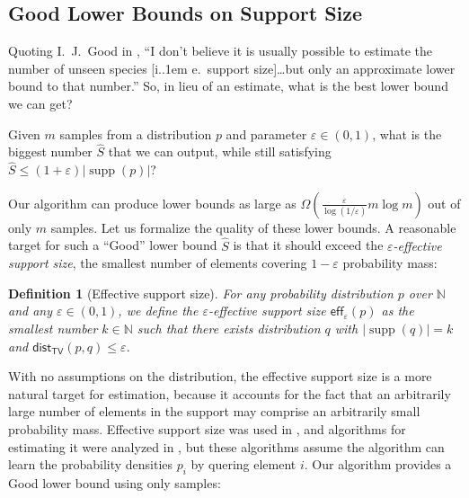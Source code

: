 \documentclass[10pt,a4paper]{article}
\newtheorem{definition}{Definition}[section]
\newcommand*\ie{i.\kern.1em e.\ }
\DeclareMathOperator{\supp}{supp}   %
\newcommand{\dist}{\mathsf{dist}}
\newcommand{\bN}{\ensuremath{\mathbb{N}}}
\newcommand{\TV}{\mathsf{TV}}
\newcommand{\eff}{\mathsf{eff}}
\renewcommand{\epsilon}{\varepsilon}
\begin{document}
\subsection{Good Lower Bounds on Support Size}
Quoting I.~J.~Good in \cite{BF93}, ``I don't believe it is usually possible to estimate the number
of unseen species [\ie support size]\dots but only an approximate lower bound to that number.'' So,
in lieu of an estimate, what is the best lower bound we can get?
\begin{question}
\label{question:good-lb}
Given $m$ samples from a distribution $p$ and parameter $\epsilon \in (0,1)$, what is the biggest
number $\widehat S$ that we can output, while still satisfying $\widehat S \leq
(1+\epsilon)|\supp(p)|$?
\end{question}
Our algorithm can produce lower bounds as large as $\Omega(\tfrac{\epsilon}{\log(1/\epsilon)} m \log
m)$ out of only $m$ samples. Let us formalize the quality of these lower bounds.  A reasonable
target for such a ``Good'' lower bound $\widehat S$ is that it should exceed the
\emph{$\epsilon$-effective support size}, the smallest number of elements covering $1-\epsilon$
probability mass:

\begin{definition}[Effective support size]
\label{def:effective}
For any probability distribution $p$ over $\bN$ and any $\epsilon \in (0,1)$, we define the
\emph{$\epsilon$-effective support size} $\eff_\epsilon(p)$ as the smallest number $k \in \bN$
such that there exists distribution $q$ with $|\supp(q)|=k$ and $\dist_\TV(p,q) \leq \epsilon$.
\end{definition}

\noindent
With no assumptions on the distribution, the effective support size is a more natural target for
estimation, because it accounts for the fact that an arbitrarily large number of elements in the
support may comprise an arbitrarily small probability mass. Effective support size was used in
\cite{CDS18,BCG19}, and algorithms for estimating it were analyzed in \cite{Gol19vdf,NT23,Gol25},
but these algorithms assume the algorithm can learn the probability densities $p_i$ by quering
element $i$. Our algorithm provides a Good lower bound using only samples:
\end{document}
